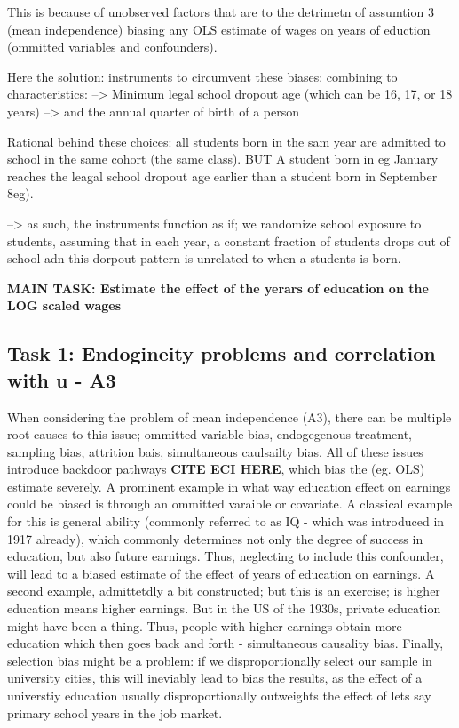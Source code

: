 \documentclass[a4paper]{article}
\begin{document}
This is because of unobserved factors that are to the detrimetn of assumtion 3 (mean independence) biasing any OLS estimate of wages on years of eduction (ommitted variables and confounders).

Here the solution: instruments to circumvent these biases; combining to characteristics: 
--> Minimum legal school dropout age (which can be 16, 17, or 18 years) 
--> and the annual quarter of birth of a person

Rational behind these choices: all students born in the sam year are admitted to school in the same cohort (the same class). BUT A student born in eg January reaches the leagal school dropout age earlier than a student born in September 8eg).

--> as such, the instruments function as if; we randomize school exposure to students, assuming that in each year, a constant fraction of students drops out of school adn this dorpout pattern is unrelated to when a students is born. 

\textbf{MAIN TASK: Estimate the effect of the yerars of education on the LOG scaled wages}

\subsection{Task 1: Endogineity problems and correlation with u - A3}
When considering the problem of mean independence (A3), there can be multiple root causes to this issue; ommitted variable bias, endogegenous treatment, sampling bias, attrition bais, simultaneous caulsailty bias. All of these issues introduce backdoor pathways \textbf{CITE ECI HERE}, which bias the (eg. OLS) estimate severely. 
A prominent example in what way education effect on earnings could be biased is through an ommitted varaible or covariate. A classical example for this is general ability (commonly referred to as IQ - which was introduced in 1917 already), which commonly determines not only the degree of success in education, but also future earnings. Thus, neglecting to include this confounder, will lead to a biased estimate of the effect of years of education on earnings.
A second example, admittetdly a bit constructed; but this is an exercise; is higher education means higher earnings. But in the US of the 1930s, private education might have been a thing. Thus, people with higher earnings obtain more education which then goes back and forth - simultaneous causality bias. 
Finally, selection bias might be a problem: if we disproportionally select our sample in university cities, this will ineviably lead to bias the results, as the effect of a universtiy education usually disproportionally outweights the effect of lets say primary school years in the job market. 
\end{document}
